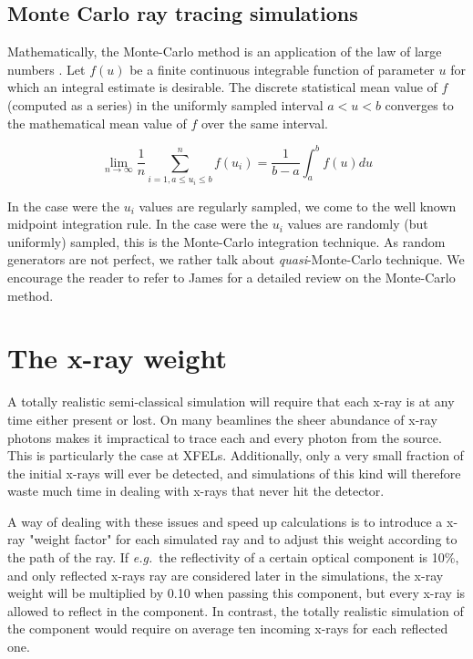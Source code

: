 \subsection{Monte Carlo ray tracing simulations}
Mathematically, the Monte-Carlo method is an application of the law of large
numbers \cite{James80,Grimmett92}. Let $f(u)$ be a finite continuous integrable
function of parameter $u$ for which an integral estimate is desirable. The
discrete statistical mean value of $f$ (computed as a series) in the uniformly
sampled interval $a < u < b$ converges to the mathematical mean value of $f$
over the same interval.

\begin{equation}
\lim_{n \rightarrow \infty} \frac{1}{n} \sum_{i=1, a \leq u_i \leq b}^n f(u_i) = \frac{1}{b-a}\int_a^b f(u) du
\end{equation}

In the case were the $u_i$ values are regularly sampled, we come to the well
known midpoint integration rule. In the case were the $u_i$ values are randomly
(but uniformly) sampled, this is the Monte-Carlo integration technique. As
random generators are not perfect, we rather talk about
\emph{quasi}-Monte-Carlo technique. We encourage the reader to refer to James
\cite{James80} for a detailed review on the Monte-Carlo method.

\section{The x-ray weight}
\label{s:probweight}
A totally realistic semi-classical simulation will require that
each x-ray is at any time either present or lost.
On many beamlines the sheer abundance of x-ray photons makes it impractical to trace each
and every photon from the source. This is particularly the case at XFELs.
Additionally, only a very small fraction of the initial x-rays will ever be detected, and
simulations of this kind will therefore waste much time in dealing
with x-rays that never hit the detector.

A way of dealing with these issues and speed up calculations is to introduce
a x-ray "weight factor" for each simulated ray and to
adjust this weight according to the path of the ray.
If {\em e.g.}\ the reflectivity of a certain
optical component is 10\%, and only reflected x-rays ray are
considered later in the simulations, the x-ray
weight will be multiplied by 0.10 when passing this component,
but every x-ray is allowed to reflect in the component.
In contrast, the totally realistic simulation of the component
would require on average ten incoming x-rays for each reflected one.

